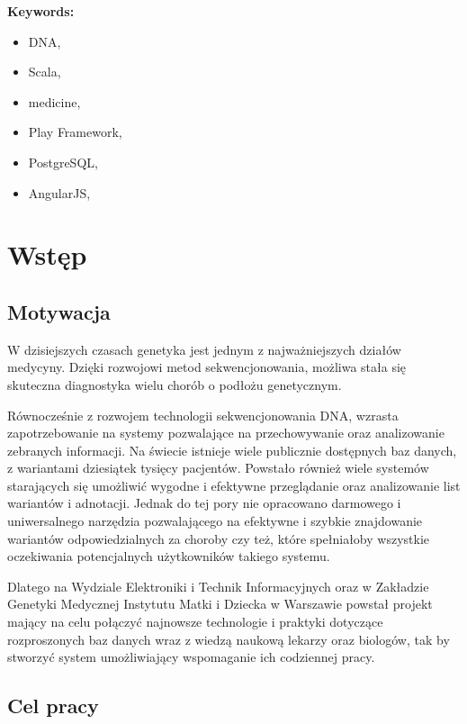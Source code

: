 \documentclass[a4paper,12pt,twoside]{article}
\begin{document}
\textbf{Keywords:}
\begin{itemize}
\item DNA,
\item Scala,
\item medicine,
\item Play Framework,
\item PostgreSQL,
\item AngularJS,
\end{itemize}
\newpage

\newpage
\tableofcontents

\newpage
\section{Wstęp}

\subsection{Motywacja}

W dzisiejszych czasach genetyka jest jednym z najważniejszych działów medycyny.
Dzięki rozwojowi metod sekwencjonowania, możliwa stała się skuteczna diagnostyka
wielu chorób o podłożu genetycznym.

Równocześnie z rozwojem technologii sekwencjonowania DNA, wzrasta zapotrzebowanie
na systemy pozwalające na przechowywanie oraz analizowanie zebranych
informacji.
Na świecie istnieje wiele publicznie dostępnych baz danych,
z wariantami dziesiątek tysięcy pacjentów. Powstało również
wiele systemów starających się umożliwić wygodne i efektywne
przeglądanie oraz analizowanie list wariantów i adnotacji.
Jednak do tej pory nie opracowano darmowego i uniwersalnego narzędzia pozwalającego
na efektywne i szybkie znajdowanie
wariantów odpowiedzialnych za choroby czy też, które spełniałoby wszystkie
oczekiwania potencjalnych użytkowników takiego systemu.

Dlatego na Wydziale Elektroniki i Technik Informacyjnych
oraz w Zakładzie Genetyki Medycznej Instytutu Matki i Dziecka w Warszawie
powstał projekt mający na celu połączyć najnowsze technologie i
praktyki dotyczące rozproszonych baz danych wraz z wiedzą naukową
lekarzy oraz biologów, tak by stworzyć system umożliwiający
wspomaganie ich codziennej pracy.

\subsection{Cel pracy}
\end{document}
